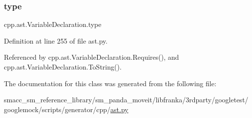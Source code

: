 \subsubsection{\texorpdfstring{type}{type}}
{\footnotesize\ttfamily cpp.\+ast.\+Variable\+Declaration.\+type}



Definition at line 255 of file ast.\+py.



Referenced by cpp.\+ast.\+Variable\+Declaration.\+Requires(), and cpp.\+ast.\+Variable\+Declaration.\+To\+String().



The documentation for this class was generated from the following file\+:\begin{DoxyCompactItemize}
\item 
smacc\+\_\+sm\+\_\+reference\+\_\+library/sm\+\_\+panda\+\_\+moveit/libfranka/3rdparty/googletest/googlemock/scripts/generator/cpp/\hyperlink{ast_8py}{ast.\+py}\end{DoxyCompactItemize}
